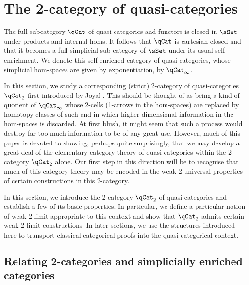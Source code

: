 
  \section{The 2-category of quasi-categories}\label{sec:twocat}

  The full subcategory $\qCat$ of quasi-categories and functors is closed in $\sSet$ under products and internal homs. 
   It follows that $\qCat$ is cartesian closed and that it becomes a full simplicial sub-category of $\sSet$ under its usual self enrichment. We denote this self-enriched category of quasi-categories, whose simplicial hom-spaces are given by exponentiation, by $\qCat_\infty$.

  In this section, we study a corresponding (strict) 2-category of quasi-categories $\qCat_2$ first introduced by Joyal \cite{Joyal:2008tq}. This should be thought of as being a kind of quotient of $\qCat_\infty$ whose 2-cells (1-arrows in the hom-spaces) are replaced by homotopy classes of such and in which higher dimensional information in the hom-spaces is discarded.  At first blush, it might seem that such a process would destroy far too much information to be of any great use. However, much of this paper is devoted to showing, perhaps quite surprisingly, that we may develop a great deal of the elementary category theory of quasi-categories within the 2-category $\qCat_2$ alone. Our first step in this direction will be to recognise that much of this category theory may be encoded in the weak 2-universal properties of certain constructions in this 2-category.

  In this section, we introduce the 2-category $\qCat_2$ of quasi-categories and establish a few of its basic properties. In particular, we define a particular notion of weak 2-limit appropriate to this context and show that $\qCat_2$ admits certain weak 2-limit constructions. In later sections, we use the structures introduced here to transport classical categorical proofs into the quasi-categorical context. 

	\subsection{Relating 2-categories and simplicially enriched categories}
	
